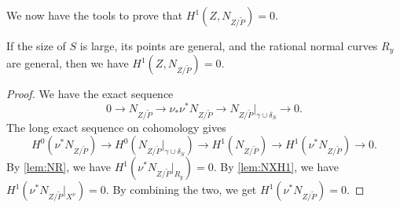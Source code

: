 \documentclass[11 pt]{amsart}
\numberwithin{equation}{section}
\begin{document}
We now have the tools to prove that $H^1(Z, N_{Z/\widetilde{P}}) = 0$.
\begin{proposition}
  \label{prop:h1n}
  If the size of $S$ is large, its points are general, and the rational normal curves $R_y$ are general, then we have $H^1(Z, N_{Z/\widetilde{P}}) = 0$.
\end{proposition}
\begin{proof}
  We have the exact sequence
  \[ 0 \to N_{Z /\widetilde{P}} \to \nu_*\nu^* N_{Z/\widetilde{P}} \to N_{Z /\widetilde{P}}\big |_{\gamma \cup \delta_S} \to 0.\]
  The long exact sequence on cohomology gives
  \[ H^0\left(\nu^* N_{Z/\widetilde{P}}\right) \to H^0\left(N_{Z/\widetilde{P}}\big|_{\gamma \cup \delta_S}\right) \to H^1\left(N_{Z/\widetilde{P}}\right) \to H^1\left(\nu^* N_{Z/\widetilde{P}}\right) \to 0.\]
  By \autoref{lem:NR}, we have $H^1(\nu^* N_{Z/\widetilde{P}}|_{R_y}) = 0$.
  By \autoref{lem:NXH1}, we have $H^1(\nu^* N_{Z/\widetilde{P}}|_{X^\nu}) = 0$.
  By combining the two, we get $H^1(\nu^* N_{Z/\widetilde{P}}) = 0$.


\end{proof}
\end{document}
